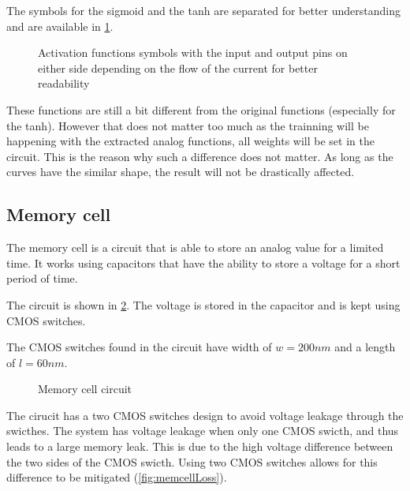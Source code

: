 The symbols for the sigmoid and the \ac{tanh} are separated for better understanding and are available in \cref{sym:af}.

\begin{figure}[t]
  \centering
  \hspace*{0.8cm}
  \hfill
  \hspace*{0.8cm}
  \caption{Activation functions symbols with the input and output pins on either side depending on the flow of the current for better readability}
  \label{sym:af}
\end{figure}

These functions are still a bit different from the original functions (especially for the \ac{tanh}). However that does not matter too much as the trainning will be happening with the extracted analog functions, all weights will be set in the circuit. This is the reason why such a difference does not matter. As long as the curves have the similar shape, the result will not be drastically affected.

\subsection{Memory cell}

The memory cell is a circuit that is able to store an analog value for a limited time. It works using capacitors that have the ability to store a voltage for a short period of time.

The circuit is shown in \cref{circt:memcell}. The voltage is stored in the capacitor and is kept using \ac{CMOS} switches.

The \ac{CMOS} switches found in the circuit have width of $w=200nm$ and a length of $l=60nm$.

\begin{figure}[t]
  \centering
  
  \caption{Memory cell circuit}
  \label{circt:memcell}
\end{figure}

The cirucit has a two \ac{CMOS} switches design to avoid voltage leakage through the swicthes. The system has voltage leakage when only one \ac{CMOS} swicth, and thus leads to a large memory leak. This is due to the high voltage difference between the two sides of the \ac{CMOS} swicth. Using two \ac{CMOS} switches allows for this difference to be mitigated (\cref{fig:memcellLoss}).

